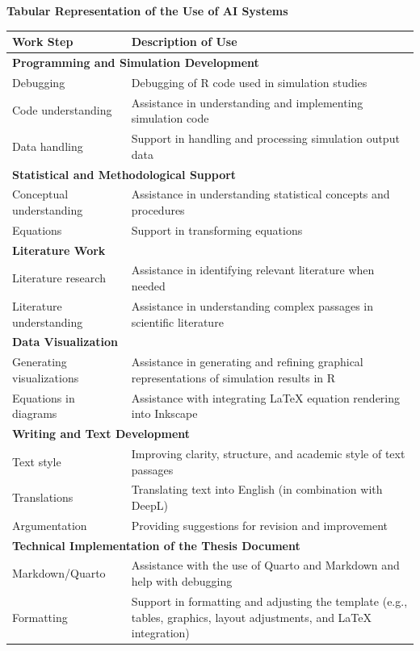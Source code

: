 \documentclass[
  letterpaper,
  11pt,
  english,
  singlespacing,
  headsepline,
  openany]{MastersDoctoralThesis}
\begin{document}
\newpage
\thispagestyle{empty}
\textbf{Tabular Representation of the Use of AI Systems}

\vspace{0.4cm}

\begin{tabularx}{\textwidth}{|p{4.5cm}|X|}
\hline
\textbf{Work Step} & \textbf{Description of Use} \\
\hline

\multicolumn{2}{|l|}{\textbf{Programming and Simulation Development}} \\
\hline
Debugging & Debugging of R code used in simulation studies \\
Code understanding & Assistance in understanding and implementing simulation code \\
Data handling & Support in handling and processing simulation output data \\
\hline

\multicolumn{2}{|l|}{\textbf{Statistical and Methodological Support}} \\
\hline
Conceptual understanding & Assistance in understanding statistical concepts and procedures \\
Equations & Support in transforming equations \\
\hline

\multicolumn{2}{|l|}{\textbf{Literature Work}} \\
\hline
Literature research & Assistance in identifying relevant literature when needed \\
Literature understanding & Assistance in understanding complex passages in scientific literature \\
\hline

\multicolumn{2}{|l|}{\textbf{Data Visualization}} \\
\hline
Generating visualizations & Assistance in generating and refining graphical representations of simulation results in R \\
Equations in diagrams & Assistance with integrating LaTeX equation rendering into Inkscape \\
\hline

\multicolumn{2}{|l|}{\textbf{Writing and Text Development}} \\
\hline
Text style & Improving clarity, structure, and academic style of text passages \\
Translations & Translating text into English (in combination with DeepL) \\
Argumentation & Providing suggestions for revision and improvement \\
\hline

\multicolumn{2}{|l|}{\textbf{Technical Implementation of the Thesis Document}} \\
\hline
Markdown/Quarto & Assistance with the use of Quarto and Markdown and help with debugging \\
Formatting & Support in formatting and adjusting the template (e.g., tables, graphics, layout adjustments, and LaTeX integration) \\
\hline
\end{tabularx}
\end{document}
